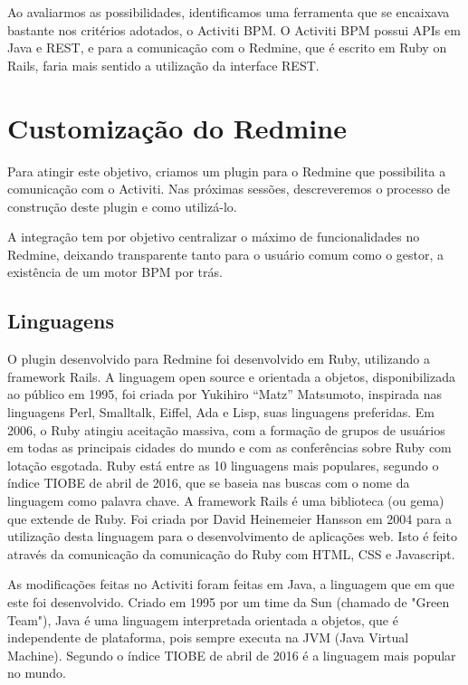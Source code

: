 Ao avaliarmos as possibilidades, identificamos uma ferramenta que se encaixava bastante nos critérios adotados, o Activiti BPM. O Activiti BPM possui APIs em Java e REST, e para a comunicação com o Redmine, que é escrito em Ruby on Rails, faria mais sentido a utilização da interface REST.

\section{Customização do Redmine}\label{sec:integracao_redmine_activiti-implementacao}

Para atingir este objetivo, criamos um plugin para o Redmine que possibilita a comunicação com o Activiti. Nas próximas sessões, descreveremos o processo de construção deste plugin e como utilizá-lo.

A integração tem por objetivo centralizar o máximo de funcionalidades no Redmine, deixando transparente tanto para o usuário comum como o gestor, a existência de um motor BPM por trás.

\subsection{Linguagens}\label{sec:integracao_redmine_activiti_implementacao_detalhes_desenvolvimento_linguagens}

O plugin desenvolvido para Redmine foi desenvolvido em Ruby\cite{ruby-lang}, utilizando a framework Rails\cite{rails}. A linguagem open source e orientada a objetos, disponibilizada ao público em 1995, foi criada por Yukihiro “Matz” Matsumoto, inspirada nas linguagens Perl, Smalltalk, Eiffel, Ada e Lisp, suas linguagens preferidas. Em 2006, o Ruby atingiu aceitação massiva, com a formação de grupos de usuários em todas as principais cidades do mundo e com as conferências sobre Ruby com lotação esgotada. Ruby está entre as 10 linguagens mais populares, segundo o índice TIOBE\cite{tiobe} de abril de 2016, que se baseia nas buscas com o nome da linguagem como palavra chave. A framework Rails é uma biblioteca (ou gema) que extende de Ruby. Foi criada por David Heinemeier Hansson em 2004 para a utilização desta linguagem para o desenvolvimento de aplicações web. Isto é feito através da comunicação da comunicação do Ruby com HTML, CSS e Javascript.

As modificações feitas no Activiti foram feitas em Java, a linguagem que em que este foi desenvolvido. Criado em 1995 por um time da Sun (chamado de "Green Team"), Java\cite{java-history} é uma linguagem interpretada orientada a objetos,  que é independente de plataforma, pois sempre executa na JVM (Java Virtual Machine). Segundo o índice TIOBE de abril de 2016 é a linguagem mais popular no mundo.

